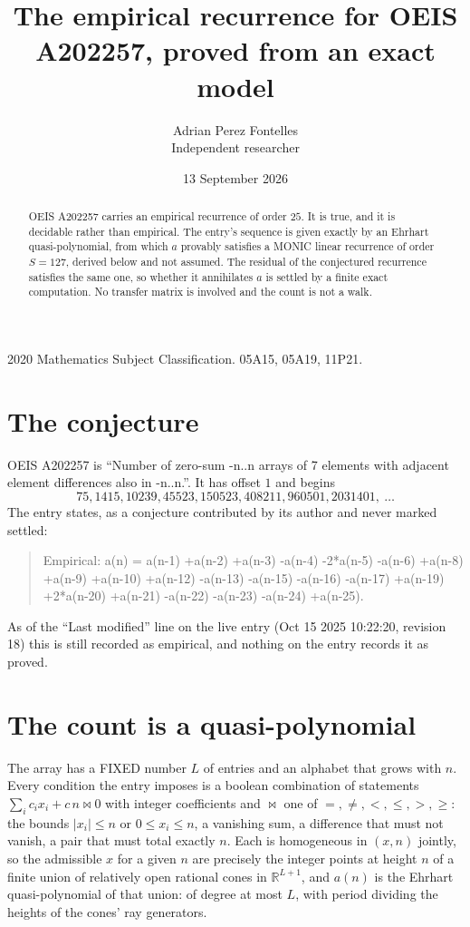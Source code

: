 \documentclass[11pt,a4paper]{article}
\title{The empirical recurrence for OEIS A202257, proved from an exact model}
\author{Adrian Perez Fontelles\\ \small Independent researcher}
\date{13 September 2026}
\theoremstyle{plain}
\theoremstyle{definition}
\begin{document}
\maketitle

\begin{abstract}
OEIS A202257 carries an empirical recurrence of order $25$. It is true, and it is
decidable rather than empirical. The entry's sequence is given exactly by an Ehrhart quasi-polynomial, from
which $a$ provably satisfies a MONIC linear recurrence of order $S=127$, derived below and not
assumed. The residual of the conjectured recurrence satisfies the same one, so whether it
annihilates $a$ is settled by a finite exact computation. No transfer matrix is involved and
the count is not a walk.
\end{abstract}

\noindent\small 2020 Mathematics Subject Classification. 05A15, 05A19, 11P21.\normalsize

\section{The conjecture}

OEIS A202257 is ``Number of zero-sum -n..n arrays of 7 elements with adjacent element differences also in -n..n.''. It has offset $1$ and begins
\[
75, 1415, 10239, 45523, 150523, 408211, 960501, 2031401,\ \dots
\]
The entry states, as a conjecture contributed by its author and never marked settled:
\begin{quote}
Empirical: a(n) = a(n-1) +a(n-2) +a(n-3) -a(n-4) -2*a(n-5) -a(n-6) +a(n-8) +a(n-9) +a(n-10) +a(n-12) -a(n-13) -a(n-15) -a(n-16) -a(n-17) +a(n-19) +2*a(n-20) +a(n-21) -a(n-22) -a(n-23) -a(n-24) +a(n-25).
\end{quote}
As of the ``Last modified'' line on the live entry (Oct 15 2025 10:22:20, revision 18)
this is still recorded as empirical, and nothing on the entry records it as proved.

\section{The count is a quasi-polynomial}

The array has a FIXED number $L$ of entries and an alphabet that grows with $n$. Every
condition the entry imposes is a boolean combination of statements
$\sum_i c_ix_i + c\,n \bowtie 0$ with integer coefficients and $\bowtie$ one of
$=,\ne,<,\le,>,\ge$: the bounds $|x_i|\le n$ or $0\le x_i\le n$, a vanishing sum, a difference
that must not vanish, a pair that must total exactly $n$. Each is homogeneous in $(x,n)$
jointly, so the admissible $x$ for a given $n$ are precisely the integer points at height $n$
of a finite union of relatively open rational cones in $\mathbb{R}^{L+1}$, and $a(n)$ is
the Ehrhart quasi-polynomial of that union: of degree at most $L$, with period dividing the
heights of the cones' ray generators.
\end{document}
